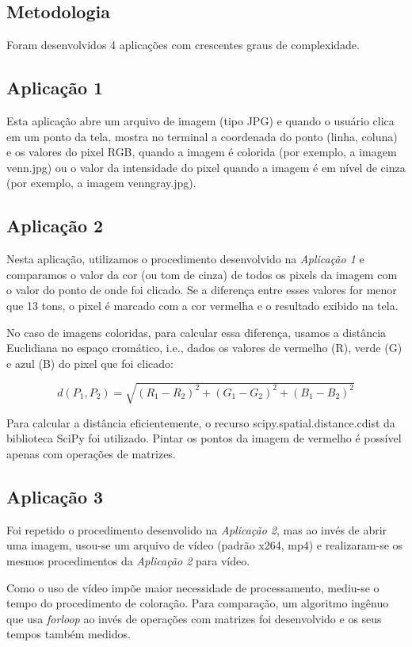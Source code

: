 \documentclass[conference]{IEEEtran}
\begin{document}
\subsection{Metodologia}
Foram desenvolvidos 4 aplicações com crescentes graus de complexidade. 
\subsection*{Aplicação 1}
Esta aplicação abre um arquivo de imagem (tipo JPG) e quando o usuário clica em um ponto da tela, mostra no terminal a coordenada do ponto (linha, coluna) e os valores do pixel RGB, quando a imagem é colorida (por exemplo, a imagem venn.jpg) ou o valor da intensidade do pixel quando a imagem é em nível de cinza (por exemplo, a imagem venngray.jpg).
\subsection*{Aplicação 2}
Nesta aplicação, utilizamos o procedimento desenvolvido na \textit{Aplicação 1} e comparamos o valor da cor (ou tom de cinza) de todos os pixels da imagem com o valor do ponto de onde foi clicado. Se a diferença entre esses valores for menor que 13 tons, o pixel é marcado com a cor vermelha e o resultado exibido na tela. 

No caso de imagens coloridas, para calcular essa diferença, usamos a distância Euclidiana no espaço cromático, i.e., dados os valores de vermelho (R), verde (G) e azul (B) do pixel que foi clicado:

\[d(P_{1},P_2) = \sqrt{(R_1-R_2)^2+(G_1-G_2)^2+(B_1-B_2)^2}\]

Para calcular a distância eficientemente, o recurso scipy.spatial.distance.cdist da biblioteca SciPy foi utilizado.  Pintar os pontos da imagem de vermelho é possível apenas com operações de matrizes.

\subsection*{Aplicação 3}

Foi repetido o procedimento desenvolido na \textit{Aplicação 2}, mas ao invés de abrir uma imagem, usou-se um arquivo de vídeo (padrão x264, mp4) e realizaram-se os mesmos procedimentos da \textit{Aplicação 2} para vídeo.

Como o uso de vídeo impõe maior necessidade de processamento, mediu-se o tempo do procedimento de coloração.  Para comparação, um algoritmo ingênuo que usa \textit{forloop} ao invés de operações com matrizes foi desenvolvido e os seus tempos também medidos.
\end{document}
